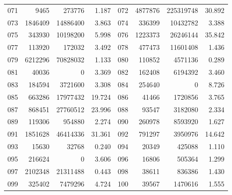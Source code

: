 \begin{longtable}{lrrr@{\hspace{16bp}}lrrr}
071 & 9465 & 273776 & 1.187 & 072 & 4877876 & 225319748 & 30.892\\
073 & 1846409 & 14886400 & 3.863 & 074 & 336399 & 10432782 & 3.388\\
075 & 343930 & 10198200 & 5.998 & 076 & 1223373 & 26246144 & 35.842\\
077 & 113920 & 172032 & 3.492 & 078 & 477473 & 11601408 & 1.436\\
079 & 6212296 & 70828032 & 1.133 & 080 & 110852 & 4571136 & 0.289\\
081 & 40036 & 0 & 3.369 & 082 & 162408 & 6194392 & 3.460\\
083 & 184594 & 3721600 & 3.308 & 084 & 254640 & 0 & 8.726\\
085 & 663286 & 17977432 & 19.724 & 086 & 41466 & 1720856 & 3.765\\
087 & 868451 & 27760512 & 23.996 & 088 & 93547 & 3182080 & 2.334\\
089 & 119306 & 954880 & 2.274 & 090 & 260978 & 8593920 & 1.627\\
091 & 1851628 & 46414336 & 31.361 & 092 & 791297 & 3950976 & 14.642\\
093 & 15630 & 32768 & 0.240 & 094 & 20349 & 425088 & 1.110\\
095 & 216624 & 0 & 3.606 & 096 & 16806 & 505364 & 1.299\\
097 & 2102348 & 21311488 & 0.443 & 098 & 38611 & 836386 & 1.430\\
099 & 325402 & 7479296 & 4.724 & 100 & 39567 & 1470616 & 1.555\\
\end{longtable}

